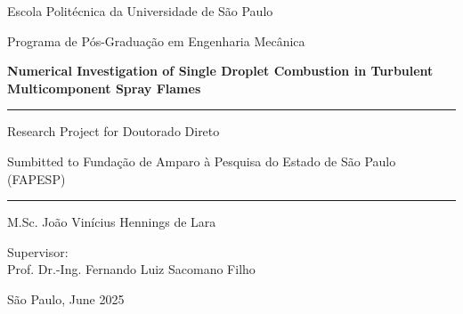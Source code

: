 \begin{titlepage}
    \centering
    \large
    {
    Escola Politécnica da Universidade de São Paulo \par
    Programa de Pós-Graduação em Engenharia Mecânica
    \par}

    \vspace*{6cm}
    
    {\bfseries\Large %
    Numerical Investigation of Single Droplet Combustion in Turbulent Multicomponent Spray Flames\par}

    \vspace{3cm}

    \hrule
    \vspace{0.4cm}
    {
    Research Project for Doutorado Direto\par
    Sumbitted to Fundação de Amparo à Pesquisa do Estado de São Paulo (FAPESP)
    }    
    \vspace{0.4cm}
    \hrule
    
    \vspace{3cm}
    {
    M.Sc. João Vinícius Hennings de Lara\par
    }
    
    \vspace{1.5cm}
    {
    Supervisor:\\ Prof. Dr.-Ing. Fernando Luiz Sacomano Filho
    }
    
    \vfill
    São Paulo, June 2025

\end{titlepage}
